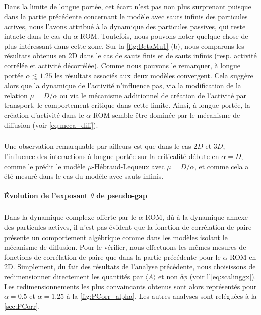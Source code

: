 \subparagraph{}Dans la limite de longue portée, cet écart n'est pas non plus surprenant puisque dans la partie précédente concernant le modèle avec sauts infinis des particules actives, nous l'avons attribué à la dynamique des particules passives, qui reste intacte dans le cas du $\alpha$-ROM. Toutefois, nous pouvons noter quelque chose de plus intéressant dans cette zone. Sur la \autoref{fig:BetaMu1}-(b), nous comparons les résultats obtenus en 2D dans le cas de sauts finis et de sauts infinis (resp. activité corrélée et activité décorrélée). Comme nous pouvons le remarquer, à longue portée $\alpha \lesssim 1.25$ les résultats associés aux deux modèles convergent. Cela suggère alors que la dynamique de l'activité n'influence pas, via la modification de la relation $\mu=D/\alpha$ ou via le mécanisme additionnel de création de l'activité par transport, le comportement critique dans cette limite. Ainsi, à longue portée, la création d'activité dans le $\alpha$-ROM semble être dominée par le mécanisme de diffusion (voir \autoref{eq:meca_diff}).

\subparagraph{}Une observation remarquable par ailleurs est que dans le cas $2D$ et $3D$, l'influence des interactions à longue portée sur la criticalité débute en $\alpha = D$, comme le prédit le modèle $\mu$-Hébraud-Lequeux avec $\mu = D/\alpha$, et comme cela a été mesuré dans le cas du modèle avec sauts infinis. 

\paragraph{Évolution de l'exposant $\theta$ de pseudo-gap}

\subparagraph{}Dans la dynamique complexe offerte par le $\alpha$-ROM, dû à la dynamique annexe des particules actives, il n'est pas évident que la fonction de corrélation de paire présente un comportement algébrique comme dans les modèles isolant le mécanisme de diffusion. Pour le vérifier, nous effectuons les mêmes mesures de fonctions de corrélation de paire que dans la partie précédente pour le $\alpha$-ROM en 2D. Simplement, du fait des résultats de l'analyse précédente, nous choisissons de redimensionner directement les quantités par $\langle A \rangle$ et non $\delta\phi$ (voir l'\autoref{eq:scalinggx}). Les redimensionnements les plus convaincants obtenus sont alors représentés pour $\alpha=0.5$ et $\alpha=1.25$ à la \autoref{fig:PCorr_alpha}. Les autres analyses sont reléguées à la \autoref{sec:PCorr}. 

